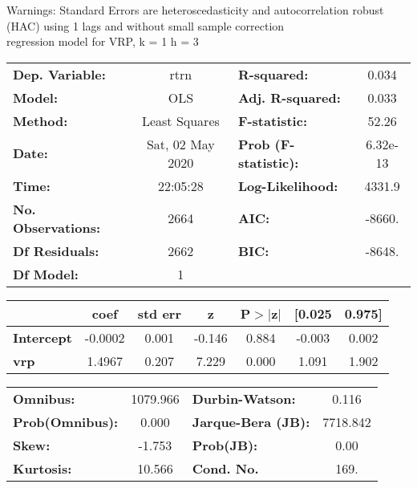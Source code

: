 Warnings: \newline
 [1] Standard Errors are heteroscedasticity and autocorrelation robust (HAC) using 1 lags and without small sample correction\\ 

regression model for VRP, k = 1 h = 3\begin{center}
\begin{tabular}{lclc}
\toprule
\textbf{Dep. Variable:}    &       rtrn       & \textbf{  R-squared:         } &     0.034   \\
\textbf{Model:}            &       OLS        & \textbf{  Adj. R-squared:    } &     0.033   \\
\textbf{Method:}           &  Least Squares   & \textbf{  F-statistic:       } &     52.26   \\
\textbf{Date:}             & Sat, 02 May 2020 & \textbf{  Prob (F-statistic):} &  6.32e-13   \\
\textbf{Time:}             &     22:05:28     & \textbf{  Log-Likelihood:    } &    4331.9   \\
\textbf{No. Observations:} &        2664      & \textbf{  AIC:               } &    -8660.   \\
\textbf{Df Residuals:}     &        2662      & \textbf{  BIC:               } &    -8648.   \\
\textbf{Df Model:}         &           1      & \textbf{                     } &             \\
\bottomrule
\end{tabular}
\begin{tabular}{lcccccc}
                   & \textbf{coef} & \textbf{std err} & \textbf{z} & \textbf{P$> |$z$|$} & \textbf{[0.025} & \textbf{0.975]}  \\
\midrule
\textbf{Intercept} &      -0.0002  &        0.001     &    -0.146  &         0.884        &       -0.003    &        0.002     \\
\textbf{vrp}       &       1.4967  &        0.207     &     7.229  &         0.000        &        1.091    &        1.902     \\
\bottomrule
\end{tabular}
\begin{tabular}{lclc}
\textbf{Omnibus:}       & 1079.966 & \textbf{  Durbin-Watson:     } &    0.116  \\
\textbf{Prob(Omnibus):} &   0.000  & \textbf{  Jarque-Bera (JB):  } & 7718.842  \\
\textbf{Skew:}          &  -1.753  & \textbf{  Prob(JB):          } &     0.00  \\
\textbf{Kurtosis:}      &  10.566  & \textbf{  Cond. No.          } &     169.  \\
\bottomrule
\end{tabular}
\end{center}

